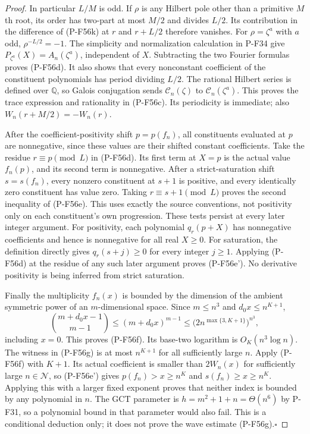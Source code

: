 \documentclass[11pt,a4paper]{article}
\begin{document}
\begin{proof}
In particular $L/M$ is odd. If $\rho$ is any Hilbert pole
other than a primitive $M$th root, its order has two-part
at most $M/2$ and divides $L/2$. Its contribution in the
difference of (P-F56k) at $r$ and $r+L/2$ therefore
vanishes. For $\rho=\zeta^a$ with $a$ odd,
$\rho^{-L/2}=-1$.
The simplicity and normalization calculation in P-F34 give
$P_{\zeta^a}(X)=A_n(\zeta^a)$, independent of $X$.
Subtracting the two Fourier formulas proves (P-F56d).
It also shows that every nonconstant coefficient of the
constituent polynomials has period dividing $L/2$.
The rational Hilbert series is defined over $\mathbb Q$,
so Galois conjugation sends $\mathcal C_n(\zeta)$ to
$\mathcal C_n(\zeta^a)$. This proves the trace expression
and rationality in (P-F56c). Its periodicity is immediate;
also $W_n(r+M/2)=-W_n(r)$.

After the coefficient-positivity shift $p=p(f_n)$, all
constituents evaluated at $p$ are nonnegative, since these
values are their shifted constant coefficients.
Take the residue $r\equiv p\pmod L$ in (P-F56d).
Its first term at $X=p$ is the actual value $f_n(p)$,
and its second term is nonnegative.
After a strict-saturation shift $s=s(f_n)$, every nonzero
constituent at $s+1$ is positive, and every identically
zero constituent has value zero. Taking
$r\equiv s+1\pmod L$ proves the second inequality of
(P-F56e). This uses exactly the source conventions, not
positivity only on each constituent's own progression.
These tests persist at every later integer argument.
For positivity, each polynomial $q_r(p+X)$ has nonnegative
coefficients and hence is nonnegative for all real $X\ge0$.
For saturation, the definition directly gives
$q_r(s+j)\ge0$ for every integer $j\ge1$.
Applying (P-F56d) at the residue of any such later argument
proves (P-F56e'). No derivative positivity is being inferred
from strict saturation.

Finally the multiplicity $f_n(x)$ is bounded by the
dimension of the ambient symmetric power of an
$m$-dimensional space. Since $m\le n^3$ and
$d_0x\le n^{K+1}$,
\[
 \binom{m+d_0x-1}{m-1}
      \le(m+d_0x)^{m-1}
      \le\bigl(2n^{\max\{3,K+1\}}\bigr)^{n^3},
\]
including $x=0$. This proves (P-F56f).
Its base-two logarithm is $O_K(n^3\log n)$.
The witness in (P-F56g) is at most $n^{K+1}$ for all
sufficiently large $n$. Apply (P-F56f) with $K+1$.
Its actual coefficient is smaller than $2W_n(x)$ for
sufficiently large $n\in\mathcal N$, so (P-F56e') gives
$p(f_n)>x\ge n^K$ and $s(f_n)\ge x\ge n^K$.
Applying this with a larger fixed exponent proves that
neither index is bounded by any polynomial in $n$.
The GCT parameter is $h=m^2+1+n=\Theta(n^6)$ by P-F31,
so a polynomial bound in that parameter would also fail.
This is a conditional deduction only; it does not prove
the wave estimate (P-F56g).\hfill$\square$
\end{proof}
\end{document}
